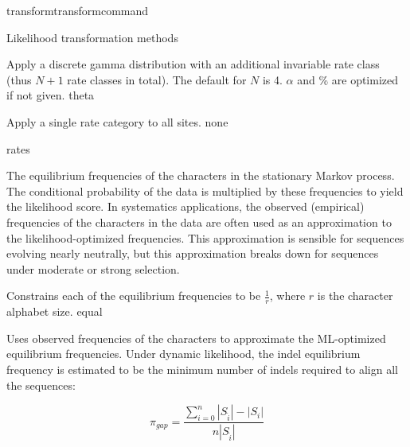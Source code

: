 \begin{command}{transform}{transformcommand}
\begin{arguments}
\begin{argumentgroup}{Likelihood transformation methods}
{\begin{description}
                        {Apply a discrete gamma distribution with an additional
                        invariable rate class (thus $N+1$ rate classes in total).
                        The default for $N$ is 4. $\alpha$ and \% are optimized if
                        not given.}
                        {theta}

                        {Apply a single rate category to all sites.}
                        {none}

                \end{description}}
                {rates}

                    {The equilibrium frequencies of the characters in the stationary
                    Markov process. The conditional probability of the data is
                    multiplied by these frequencies to yield the likelihood score.
                    In systematics applications, the observed (empirical)
                    frequencies of the characters in the data are often used as an
                    approximation to the likelihood-optimized frequencies. This
                    approximation is sensible for sequences evolving nearly
                    neutrally, but this approximation breaks down for sequences
                    under moderate or strong selection.

                    \begin{description}

                            {Constrains each of the equilibrium frequencies to be
                            $\frac{1}{r}$, where $r$ is the character alphabet size.}
                            {equal}

                            {Uses observed frequencies of the characters to
                            approximate the ML-optimized equilibrium
                            frequencies.  Under dynamic likelihood, the indel
                            equilibrium frequency is estimated to be the minimum
                            number of indels required to align all the
                            sequences: 
                            
                            \begin{equation*}
                            \pi_{gap} = \frac{\sum_{i=0}^n
                            |S_{\hat{i}}| - |S_i|}{n |S_{\hat{i}}|}
                            \end{equation*}
                            
}
\end{description}}
\end{argumentgroup}
\end{arguments}
\end{command}

